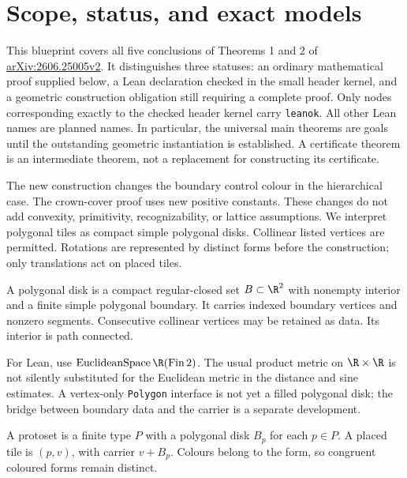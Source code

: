 \section{Scope, status, and exact models}

This blueprint covers all five conclusions of Theorems 1 and 2 of
\href{https://arxiv.org/abs/2606.25005v2}{arXiv:2606.25005v2}.
It distinguishes three statuses: an ordinary mathematical proof supplied
below, a Lean declaration checked in the small header kernel, and a
geometric construction obligation still requiring a complete proof.
Only nodes corresponding exactly to the checked header kernel carry
\texttt{leanok}. All other Lean names are planned names.
In particular, the universal main theorems are goals until the outstanding
geometric instantiation is established. A certificate theorem is an
intermediate theorem, not a replacement for constructing its certificate.

The new construction changes the boundary control colour in the hierarchical
case. The crown-cover proof uses new positive constants. These changes do
not add convexity, primitivity, recognizability, or lattice assumptions.
We interpret polygonal tiles as compact simple polygonal disks. Collinear
listed vertices are permitted. Rotations are represented by distinct forms
before the construction; only translations act on placed tiles.

\begin{definition}\label{def:polygon}
A polygonal disk is a compact regular-closed set $B\subset\R^2$ with
nonempty interior and a finite simple polygonal boundary. It carries
indexed boundary vertices and nonzero segments. Consecutive collinear
vertices may be retained as data. Its interior is path connected.
\end{definition}

For Lean, use $\operatorname{EuclideanSpace}\R(\operatorname{Fin}2)$.
The usual product metric on $\R\times\R$ is not silently substituted for
the Euclidean metric in the distance and sine estimates. A vertex-only
\texttt{Polygon} interface is not yet a filled polygonal disk; the bridge
between boundary data and the carrier is a separate development.

\begin{definition}\label{def:protoset}
A protoset is a finite type $P$ with a polygonal disk $B_p$ for each $p\in P$.
A placed tile is $(p,v)$, with carrier $v+B_p$. Colours belong to the form,
so congruent coloured forms remain distinct.
\end{definition}

